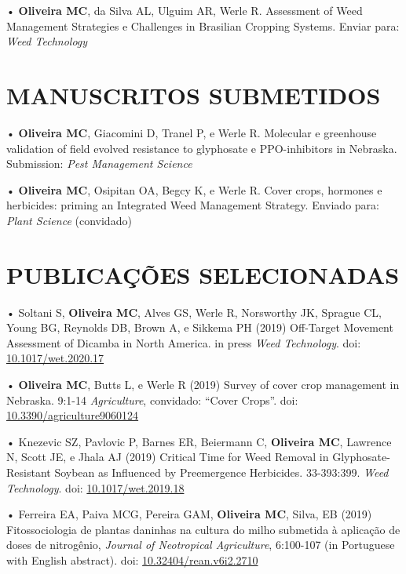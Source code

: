 \documentclass[11pt,]{article}
\begin{document}
• \textbf{Oliveira MC}, da Silva AL, Ulguim AR, Werle R. Assessment of
Weed Management Strategies e Challenges in Brasilian Cropping Systems.
Enviar para: \emph{Weed Technology}

\hypertarget{manuscritos-submetidos}{%
\section{MANUSCRITOS SUBMETIDOS}\label{manuscritos-submetidos}}

• \textbf{Oliveira MC}, Giacomini D, Tranel P, e Werle R. Molecular e
greenhouse validation of field evolved resistance to glyphosate e
PPO-inhibitors in Nebraska. Submission: \emph{Pest Management Science}

• \textbf{Oliveira MC}, Osipitan OA, Begcy K, e Werle R. Cover crops,
hormones e herbicides: priming an Integrated Weed Management Strategy.
Enviado para: \emph{Plant Science} (convidado)

\hypertarget{publicauxe7uxf5es-selecionadas}{%
\section{PUBLICAÇÕES
SELECIONADAS}\label{publicauxe7uxf5es-selecionadas}}

• Soltani S, \textbf{Oliveira MC}, Alves GS, Werle R, Norsworthy JK,
Sprague CL, Young BG, Reynolds DB, Brown A, e Sikkema PH (2019)
Off-Target Movement Assessment of Dicamba in North America. in press
\emph{Weed Technology}. doi:
\href{https://doi.org/10.1017/wet.2020.17}{10.1017/wet.2020.17}

• \textbf{Oliveira MC}, Butts L, e Werle R (2019) Survey of cover crop
management in Nebraska. 9:1-14 \emph{Agriculture}, convidado: ``Cover
Crops''. doi:
\href{https://doi.org/10.3390/agriculture9060124}{10.3390/agriculture9060124}

• Knezevic SZ, Pavlovic P, Barnes ER, Beiermann C, \textbf{Oliveira MC},
Lawrence N, Scott JE, e Jhala AJ (2019) Critical Time for Weed Removal
in Glyphosate-Resistant Soybean as Influenced by Preemergence
Herbicides. 33-393:399. \emph{Weed Technology}. doi:
\href{https://doi.org/10.1017/wet.2019.18}{10.1017/wet.2019.18}

• Ferreira EA, Paiva MCG, Pereira GAM, \textbf{Oliveira MC}, Silva, EB
(2019) Fitossociologia de plantas daninhas na cultura do milho submetida
à aplicação de doses de nitrogênio, \emph{Journal of Neotropical
Agriculture}, 6:100-107 (in Portuguese with English abstract). doi:
\href{https://doi.org/10.32404/rean.v6i2.2710}{10.32404/rean.v6i2.2710}
\end{document}
